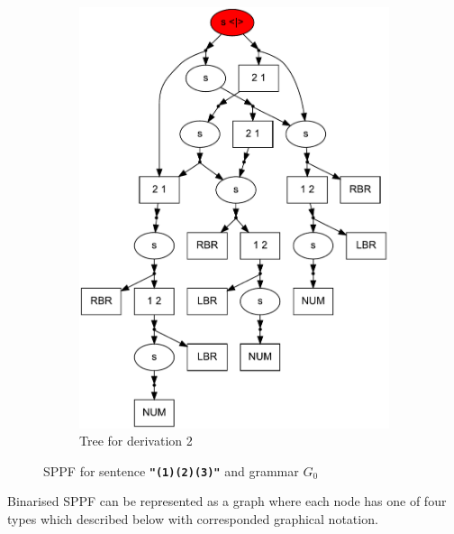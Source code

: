 \begin{figure}[ht]
\begin{center}
\begin{subfigure}[b]{0.3\textwidth}
        \includegraphics[width=\textwidth]{dot/Brackets.pdf}
        \caption{Tree for derivation 2}
        \label{tree2}        
    \end{subfigure}
    \caption{SPPF for sentence \textbf{\texttt{"(1)(2)(3)"}} and grammar $G_0$}
    \label{sppfSample}
    \end{center}                
\end{figure}

Binarised SPPF can be represented as a graph where each node has one of four types which described below with corresponded graphical notation.


